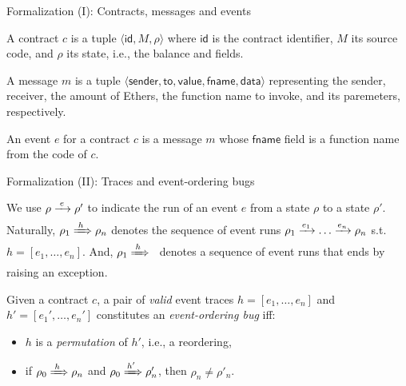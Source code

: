 \documentclass[9pt]{beamer}
\begin{document}
\begin{frame}{Formalization (I): Contracts, messages and events}
  \begin{definition}[Contract]
    A contract $c$ is a tuple $\langle \mathsf{id}, M, \rho \rangle$
    where $\mathsf{id}$ is the contract identifier, $M$ its source
    code, and $\rho$ its state, i.e., the balance and fields.
  \end{definition}
  \pause
  \begin{definition}[Message]
    A message $m$ is a tuple
    $\langle \mathsf{sender}, \mathsf{to}, \mathsf{value},
    \mathsf{fname}, \mathsf{data} \rangle$ representing the sender,
    receiver, the amount of Ethers, the function name to invoke, and
    its paremeters, respectively.
  \end{definition}
  \pause
  \begin{definition}[Event]
    An event $e$ for a contract $c$ is a message $m$ whose
    $\mathsf{fname}$ field is a function name from the code of $c$.
  \end{definition}
\end{frame}
%
\begin{frame}{Formalization (II): Traces and event-ordering bugs}
  \begin{definition}[Trace]
    We use $\rho \estep{e} \rho'$ to indicate the run of an event
    $e$ from a state $\rho$ to a state $\rho'$.
    Naturally, $\rho_1 \tstep{h} \rho_n$ denotes the sequence of event
    runs $\rho_1 \estep{e_1} \ldots \estep{e_n} \rho_n$
    s.t.~$h = [e_1,\ldots,e_n]$.
    And, $\rho_1 \tstep{h}$ \Lightning\ denotes a sequence of event runs
    that ends by raising an exception.
  \end{definition}
  \pause
  \begin{definition}
    Given a contract $c$, a pair of \emph{valid} event traces
    $h = [e_1,\ldots,e_n]$ and $h' = [e_1',\ldots,e_n']$
    constitutes an \emph{event-ordering bug} iff:
    \begin{itemize}
    \item $h$ is a \emph{permutation} of $h'$, i.e., a reordering,
    \item if $\rho_0 \tstep{h} \rho_n$ and
      $\rho_0 \tstep{h'} \rho'_n$, then $\rho_n \neq \rho'_n$.
    \end{itemize}
  \end{definition}
\end{frame}
%
\end{document}
